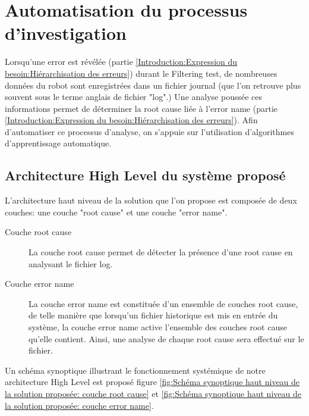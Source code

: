 \chapter{Automatisation du processus d'investigation}
\label{Automatisation du processus d'investigation}
\thispagestyle{fancy}
Lorsqu'une error est révélée (partie \ref{Introduction:Expression du besoin:Hiérarchisation des erreurs}) durant le Filtering test, de nombreuses données du robot sont enregistrées dans un fichier journal (que l'on retrouve plus souvent sous le terme anglais de fichier "log".) Une analyse poussée ces informations permet de déterminer la root cause liée à l'error name (partie \ref{Introduction:Expression du besoin:Hiérarchisation des erreurs}). Afin d'automatiser ce processus d'analyse, on s'appuie sur l'utilisation d'algorithmes d'apprentissage automatique. 

\section{Architecture High Level du système proposé}
\label{Automatisation du processus d'investigation: Achitecture High Level du système proposé}
L'architecture haut niveau de la solution que l'on propose est composée de deux couches: une couche "root cause" et une couche "error name".
\begin{description}
	\item [Couche root cause] La couche root cause permet de détecter la présence d'une root cause en analysant le fichier log.
	\item [Couche error name] La couche error name est constituée d'un ensemble de couches root cause, de telle manière que lorsqu'un fichier historique est mis en entrée du système, la couche error name active l'ensemble des couches root cause qu'elle contient. Ainsi, une analyse de chaque root cause sera effectué sur le fichier.
\end{description} 

Un schéma synoptique illustrant le fonctionnement systémique de notre architecture High Level est proposé figure \ref{fig:Schéma synoptique haut niveau de la solution proposée: couche root cause} et \ref{fig:Schéma synoptique haut niveau de la solution proposée: couche error name}.

